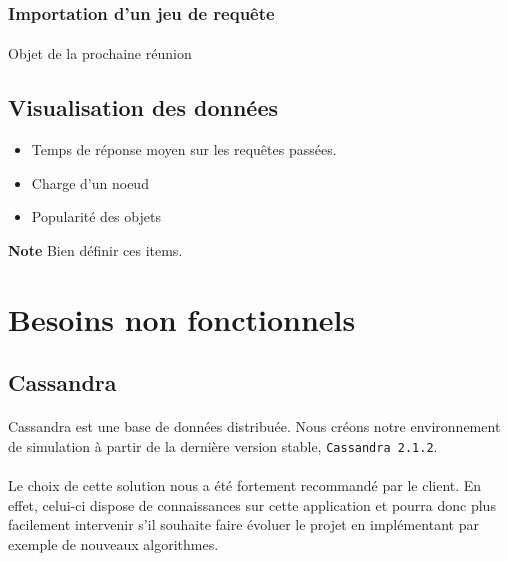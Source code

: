 \documentclass[12pt]{article}
\begin{document}
\subsubsection{Importation d'un jeu de requête}

\paragraph{} Objet de la prochaine réunion


\subsection{Visualisation des données}

\begin{itemize}
 \item Temps de réponse moyen sur les requêtes passées.
 \item Charge d'un noeud
 \item Popularité des objets
\end{itemize}

\textbf{Note } Bien définir ces items. \newline



\newpage

\section{Besoins non fonctionnels}

\subsection{Cassandra}

\paragraph{} Cassandra est une base de données distribuée.
Nous créons notre environnement de simulation à partir de la dernière version stable, \texttt{Cassandra 2.1.2}.

\paragraph{} Le choix de cette solution nous a été fortement recommandé par le client.
En effet, celui-ci dispose de connaissances sur cette application et pourra donc plus facilement intervenir s'il souhaite faire évoluer le projet en implémentant par exemple de nouveaux algorithmes.
\end{document}
